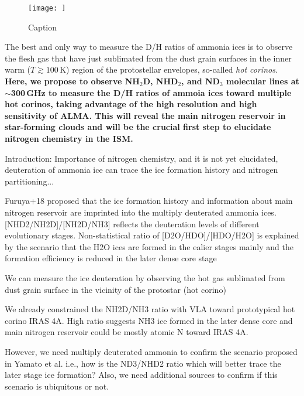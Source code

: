 \documentclass[12pt,a4paper]{article}  %
\begin{document}
\begin{figure}[t]
    \centering
    \texttt{[image: ]}
    \caption{Caption}
    \label{fig:my_label}
\end{figure}

\smallskip
\noindent The best and only way to measure the D/H ratios of ammonia ices is to observe the flesh gas that have just sublimated from the dust grain surfaces in the inner warm ($T\gtrsim100$\,K) region of the protostellar envelopes, so-called \textit{hot corinos}. \textbf{Here, we propose to observe NH$_2$D, NHD$_2$, and ND$_3$ molecular lines at $\sim$300\,GHz to measure the D/H ratios of ammoia ices toward multiple hot corinos, taking advantage of the high resolution and high sensitivity of ALMA. This will reveal the main nitrogen reservoir in star-forming clouds and will be the crucial first step to elucidate nitrogen chemistry in the ISM.}





\color{red}
Introduction: Importance of nitrogen chemistry, and it is not yet elucidated, deuteration of ammonia ice can trace the ice formation history and nitrogen partitioning...

Furuya+18 proposed that the ice formation history and information about main nitrogen reservoir are imprinted into the multiply deuterated ammonia ices. [NHD2/NH2D]/[NH2D/NH3] reflects the deuteration levels of different evolutionary stages. Non-statistical ratio of [D2O/HDO]/[HDO/H2O] is explained by the scenario that the H2O ices are formed in the ealier stages mainly and the formation efficiency is reduced in the later dense core stage

We can measure the ice deuteration by observing the hot gas sublimated from dust grain surface in the vicinity of the protostar (hot corino)

We already constrained the NH2D/NH3 ratio with VLA toward prototypical hot corino IRAS 4A. High ratio suggests NH3 ice formed in the later dense core and main nitrogen reservoir could be mostly atomic N toward IRAS 4A. 

However, we need multiply deuterated ammonia to confirm the scenario proposed in Yamato et al. i.e., how is the ND3/NHD2 ratio which will better trace the later stage ice formation? Also, we need additional sources to confirm if this scenario is ubiquitous or not.

\color{black}
\end{document}
